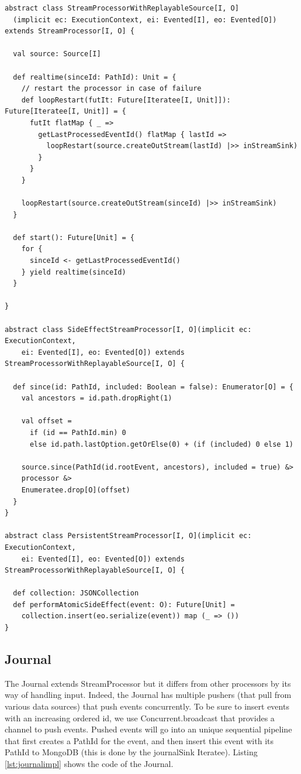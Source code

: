 \begin{verbatim}
abstract class StreamProcessorWithReplayableSource[I, O]
  (implicit ec: ExecutionContext, ei: Evented[I], eo: Evented[O]) extends StreamProcessor[I, O] {

  val source: Source[I]

  def realtime(sinceId: PathId): Unit = {
    // restart the processor in case of failure
    def loopRestart(futIt: Future[Iteratee[I, Unit]]): Future[Iteratee[I, Unit]] = {
      futIt flatMap { _ =>
        getLastProcessedEventId() flatMap { lastId =>
          loopRestart(source.createOutStream(lastId) |>> inStreamSink)
        }
      }
    }

    loopRestart(source.createOutStream(sinceId) |>> inStreamSink)
  }

  def start(): Future[Unit] = {
    for {
      sinceId <- getLastProcessedEventId()
    } yield realtime(sinceId)
  }

}

abstract class SideEffectStreamProcessor[I, O](implicit ec: ExecutionContext,
    ei: Evented[I], eo: Evented[O]) extends StreamProcessorWithReplayableSource[I, O] {

  def since(id: PathId, included: Boolean = false): Enumerator[O] = {
    val ancestors = id.path.dropRight(1)

    val offset =
      if (id == PathId.min) 0
      else id.path.lastOption.getOrElse(0) + (if (included) 0 else 1)

    source.since(PathId(id.rootEvent, ancestors), included = true) &>
    processor &>
    Enumeratee.drop[O](offset)
  }
}

abstract class PersistentStreamProcessor[I, O](implicit ec: ExecutionContext, 
    ei: Evented[I], eo: Evented[O]) extends StreamProcessorWithReplayableSource[I, O] {

  def collection: JSONCollection
  def performAtomicSideEffect(event: O): Future[Unit] = 
    collection.insert(eo.serialize(event)) map (_ => ())
}
\end{verbatim}


\subsection{Journal}

The Journal extends StreamProcessor but it differs from other processors by its way of handling input. Indeed, the Journal has multiple pushers (that pull from various data sources) that push events concurrently. To be sure to insert events with an increasing ordered id, we use Concurrent.broadcast that provides a channel to push events. Pushed events will go into an unique sequential pipeline that first creates a PathId for the event, and then insert this event with its PathId to MongoDB (this is done by the journalSink Iteratee). Listing \ref{lst:journalimpl} shows the code of the Journal.

